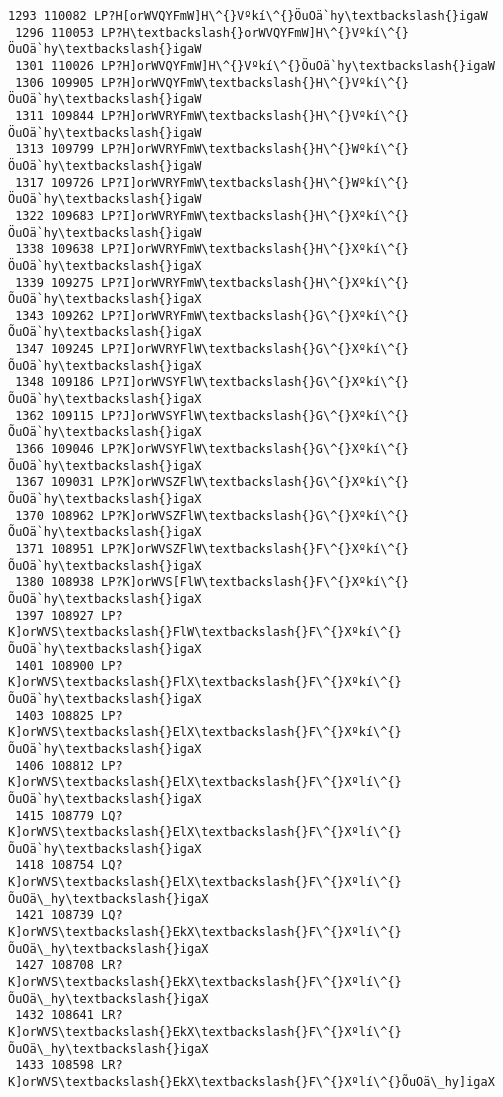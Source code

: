\documentclass[11pt]{article}
\begin{document}
\begin{Verbatim}[commandchars=\\\{\}]
 1293 110082 LP?H[orWVQYFmW]H\^{}Vºkí\^{}ÖuOä`hy\textbackslash{}igaW
 1296 110053 LP?H\textbackslash{}orWVQYFmW]H\^{}Vºkí\^{}ÖuOä`hy\textbackslash{}igaW
 1301 110026 LP?H]orWVQYFmW]H\^{}Vºkí\^{}ÖuOä`hy\textbackslash{}igaW
 1306 109905 LP?H]orWVQYFmW\textbackslash{}H\^{}Vºkí\^{}ÖuOä`hy\textbackslash{}igaW
 1311 109844 LP?H]orWVRYFmW\textbackslash{}H\^{}Vºkí\^{}ÖuOä`hy\textbackslash{}igaW
 1313 109799 LP?H]orWVRYFmW\textbackslash{}H\^{}Wºkí\^{}ÖuOä`hy\textbackslash{}igaW
 1317 109726 LP?I]orWVRYFmW\textbackslash{}H\^{}Wºkí\^{}ÖuOä`hy\textbackslash{}igaW
 1322 109683 LP?I]orWVRYFmW\textbackslash{}H\^{}Xºkí\^{}ÖuOä`hy\textbackslash{}igaW
 1338 109638 LP?I]orWVRYFmW\textbackslash{}H\^{}Xºkí\^{}ÖuOä`hy\textbackslash{}igaX
 1339 109275 LP?I]orWVRYFmW\textbackslash{}H\^{}Xºkí\^{}ÕuOä`hy\textbackslash{}igaX
 1343 109262 LP?I]orWVRYFmW\textbackslash{}G\^{}Xºkí\^{}ÕuOä`hy\textbackslash{}igaX
 1347 109245 LP?I]orWVRYFlW\textbackslash{}G\^{}Xºkí\^{}ÕuOä`hy\textbackslash{}igaX
 1348 109186 LP?I]orWVSYFlW\textbackslash{}G\^{}Xºkí\^{}ÕuOä`hy\textbackslash{}igaX
 1362 109115 LP?J]orWVSYFlW\textbackslash{}G\^{}Xºkí\^{}ÕuOä`hy\textbackslash{}igaX
 1366 109046 LP?K]orWVSYFlW\textbackslash{}G\^{}Xºkí\^{}ÕuOä`hy\textbackslash{}igaX
 1367 109031 LP?K]orWVSZFlW\textbackslash{}G\^{}Xºkí\^{}ÕuOä`hy\textbackslash{}igaX
 1370 108962 LP?K]orWVSZFlW\textbackslash{}G\^{}Xºkí\^{}ÕuOä`hy\textbackslash{}igaX
 1371 108951 LP?K]orWVSZFlW\textbackslash{}F\^{}Xºkí\^{}ÕuOä`hy\textbackslash{}igaX
 1380 108938 LP?K]orWVS[FlW\textbackslash{}F\^{}Xºkí\^{}ÕuOä`hy\textbackslash{}igaX
 1397 108927 LP?K]orWVS\textbackslash{}FlW\textbackslash{}F\^{}Xºkí\^{}ÕuOä`hy\textbackslash{}igaX
 1401 108900 LP?K]orWVS\textbackslash{}FlX\textbackslash{}F\^{}Xºkí\^{}ÕuOä`hy\textbackslash{}igaX
 1403 108825 LP?K]orWVS\textbackslash{}ElX\textbackslash{}F\^{}Xºkí\^{}ÕuOä`hy\textbackslash{}igaX
 1406 108812 LP?K]orWVS\textbackslash{}ElX\textbackslash{}F\^{}Xºlí\^{}ÕuOä`hy\textbackslash{}igaX
 1415 108779 LQ?K]orWVS\textbackslash{}ElX\textbackslash{}F\^{}Xºlí\^{}ÕuOä`hy\textbackslash{}igaX
 1418 108754 LQ?K]orWVS\textbackslash{}ElX\textbackslash{}F\^{}Xºlí\^{}ÕuOä\_hy\textbackslash{}igaX
 1421 108739 LQ?K]orWVS\textbackslash{}EkX\textbackslash{}F\^{}Xºlí\^{}ÕuOä\_hy\textbackslash{}igaX
 1427 108708 LR?K]orWVS\textbackslash{}EkX\textbackslash{}F\^{}Xºlí\^{}ÕuOä\_hy\textbackslash{}igaX
 1432 108641 LR?K]orWVS\textbackslash{}EkX\textbackslash{}F\^{}Xºlí\^{}ÕuOä\_hy\textbackslash{}igaX
 1433 108598 LR?K]orWVS\textbackslash{}EkX\textbackslash{}F\^{}Xºlí\^{}ÕuOä\_hy]igaX

\end{Verbatim}
\end{document}
